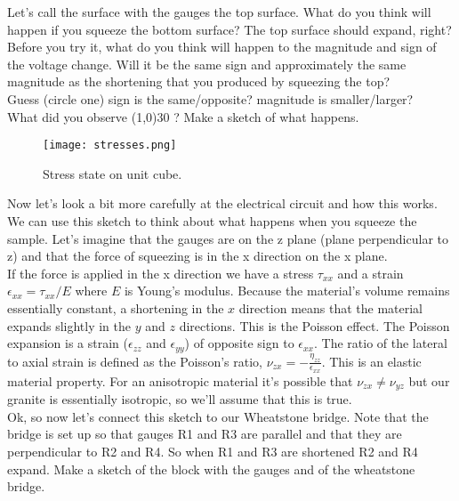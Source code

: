 \documentclass[10pt]{article}
\begin{document}
Let’s call the surface with the gauges the top surface.  What do you think will happen if you squeeze the bottom surface? The top surface should expand, right?  Before you try it, what do you think will happen to the magnitude and sign of the voltage change. Will it be the same sign and approximately the same magnitude as the shortening that you produced by squeezing the top? \\

Guess (circle one) sign is the same/opposite? magnitude is smaller/larger?\\

What did you observe \line(1,0){30} ? Make a sketch of what happens. \\

\begin{figure}[ht]
	\centering
	\texttt{[image: stresses.png]}
	\caption{Stress state on unit cube.}
	\label{fig:stresses}
\end{figure}

Now let’s look a bit more carefully at the electrical circuit and how this works. We can use this sketch to think about what happens when you squeeze the sample. Let’s imagine that the gauges are on the z plane (plane perpendicular to z) and that the force of squeezing is in the x direction on the x plane. \\

If the force is applied in the x direction we have a stress $ \tau_{xx} $ and a strain $ \epsilon_{xx} = \tau_{xx}/E $ where $ E $ is Young’s modulus.   Because the material’s volume remains essentially constant, a shortening in the $ x $ direction means that the material expands slightly in the $ y $ and $ z $ directions. This is the Poisson effect.  The Poisson expansion is a strain ($ \epsilon_{zz} $ and $ \epsilon_{yy} $) of opposite sign to $ \epsilon_{xx} $.  The ratio of the lateral to axial strain is defined as the Poisson’s ratio, $ \nu_{zx} = -\frac{\eta_{zz}}{\epsilon_{xx}}$.  This is an elastic material property.  For an anisotropic material it’s possible that  $ \nu_{zx} \neq \nu_{yz}$ but our granite is essentially isotropic, so we’ll assume that this is true.
\\

Ok, so now let’s connect this sketch to our Wheatstone bridge.  Note that the bridge is set up so that gauges R1 and R3 are parallel and that they are perpendicular to R2 and R4.  So when R1 and R3 are shortened R2 and R4 expand.
Make a sketch of the block with the gauges and of the wheatstone bridge. 
\vspace{4cm}
\end{document}

